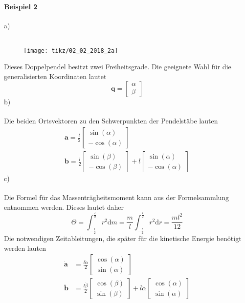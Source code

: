 \textbf{Beispiel 2}\\ \\
a)\\ \\
\begin{figure}[h]
	\centering
	\texttt{[image: tikz/02\_02\_2018\_2a]}
\end{figure}
\newline 
Dieses Doppelpendel besitzt zwei Freiheitsgrade. Die geeignete Wahl für die generalisierten Koordinaten lautet
\[
	\textbf{q} = \begin{bmatrix}
		\alpha \\
		\beta 
	\end{bmatrix}
\]
b) \\ \\
Die beiden Ortsvektoren zu den Schwerpunkten der Pendelstäbe lauten
\begin{align*}
	\textbf{a} = \frac{l}{2} \begin{bmatrix}
		\sin(\alpha) \\
		-\cos(\alpha)
	\end{bmatrix}
	\\
	\textbf{b} = \frac{l}{2}\begin{bmatrix}
		\sin(\beta) \\
		-\cos(\beta)
	\end{bmatrix}
	+ l \begin{bmatrix}
		\sin(\alpha) \\
		-\cos(\alpha)
	\end{bmatrix}
\end{align*}
c)\\ \\
Die Formel für das Massenträgheitsmoment kann aus der Formelsammlung entnommen werden. Dieses lautet daher
\[	
	\varTheta = \int_{-\frac{l}{2}}^{\frac{l}{2}}r^2\text{d}m = \frac{m}{l}\int_{-\frac{l}{2}}^{\frac{l}{2}}r^2\text{d}r = \frac{ml^2}{12}
\]
Die notwendigen Zeitableitungen, die später für die kinetische Energie benötigt werden lauten 
\begin{align*}
	\dot{\textbf{a}} &= \frac{l\dot{\alpha}}{2}\begin{bmatrix}
		\cos(\alpha) \\
		\sin(\alpha)
	\end{bmatrix}
	\\
	\dot{\textbf{b}} &= \frac{l\dot{\beta}}{2}\begin{bmatrix}
		\cos(\beta) \\
		\sin(\beta)
	\end{bmatrix}
	+ l\dot{\alpha}\begin{bmatrix}
		\cos(\alpha) \\
		\sin(\alpha)
	\end{bmatrix}
\end{align*}
